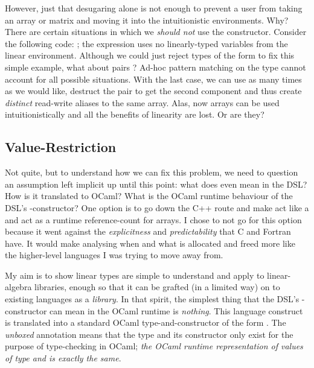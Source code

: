 However, just that desugaring alone is not enough to prevent a user from taking
an array or matrix and moving it into the intuitionistic environments. Why?
There are certain situations in which we \emph{should not} use the 
constructor.  Consider the following code: ; the expression  uses no linearly-typed variables
from the linear environment. Although we could just reject types of the form
 to fix this simple example, what about pairs ?  Ad-hoc pattern matching on the type cannot
account for all possible situations. With the last case, we can use 
as many times as we would like, destruct the pair to get the second component
and thus create \emph{distinct} read-write aliases to the same array.  Alas,
now arrays can be used intuitionistically and all the benefits of linearity are
lost.  Or are they?

\subsection{Value-Restriction}

Not quite, but to understand how we can fix this problem, we need to question
an assumption left implicit up until this point: what does  even
mean in the DSL? How is it translated to OCaml? What is the OCaml runtime
behaviour of the DSL's -constructor? One option is to go down the
C++ route and make  act like a  and act as a
runtime reference-count for arrays. I chose to not go for this option because
it went against the \emph{explicitness} and \emph{predictability} that C and
Fortran have. It would make analysing when and what is allocated and freed more
like the higher-level languages I was trying to move away from.

My aim is to show linear types are simple to understand and apply to
linear-algebra libraries, enough so that it can be grafted (in a limited way)
on to existing languages as a \emph{library}. In that spirit, the simplest
thing that the DSL's -constructor can mean in the OCaml runtime is
\emph{nothing}.  This language construct is translated into a standard OCaml
type-and-constructor of the form .
The \emph{unboxed} annotation means that the type and its constructor only
exist for the purpose of type-checking in OCaml; \emph{the OCaml runtime
representation of values of type  and  is exactly the
same}.


